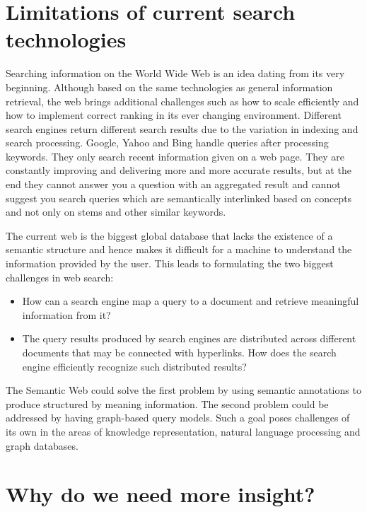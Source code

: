 \section{Limitations of current search technologies}
Searching information on the World Wide Web is an idea dating from its very beginning. Although based on the same technologies as general information retrieval, the web brings additional challenges such as how to scale efficiently and how to implement correct ranking in its ever changing environment. Different search engines return different search results due to the variation in indexing and search processing. Google, Yahoo and Bing handle queries after processing keywords. They only search recent information given on a web page. They are constantly improving and delivering more and more accurate results, but at the end they cannot answer you a question with an aggregated result and cannot suggest you search queries which are semantically interlinked based on concepts and not only on stems and other similar keywords. 

The current web is the biggest global database that lacks the existence of a semantic structure and hence makes it difficult for a machine to understand the information provided by the user. This leads to formulating the two biggest challenges in web search: 

\begin{itemize}
    \item How can a search engine map a query to a document and retrieve meaningful information from it?
    \item The query results produced by search engines are distributed across different documents that may be connected with hyperlinks. How does the search engine efficiently recognize such distributed results? 
\end{itemize}
The Semantic Web could solve the first problem by using semantic annotations to produce structured by meaning information. The second problem could be addressed by having graph-based query models. Such a goal poses challenges of its own in the areas of 
knowledge representation, natural language processing and graph databases.

\section{Why do we need more insight?}

